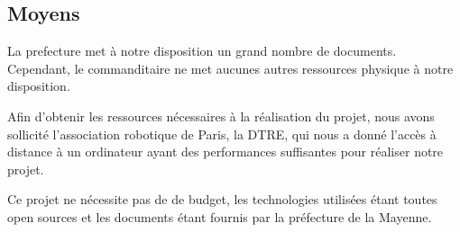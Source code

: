 \subsection{Moyens}
La prefecture met à notre disposition un grand nombre de documents.
Cependant, le commanditaire ne met aucunes autres ressources physique à notre disposition.


Afin d'obtenir les ressources nécessaires à la réalisation du projet, nous avons sollicité l'association robotique de Paris, la DTRE, qui nous a donné l'accès à distance à un ordinateur ayant des performances suffisantes pour réaliser notre projet.


Ce projet ne nécessite pas de de budget, les technologies utilisées étant toutes open sources et les documents étant fournis par la préfecture de la Mayenne.

